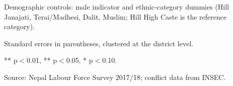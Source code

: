 \begin{table}[!h]
\begin{threeparttable}
\begin{tablenotes}
\item Demographic controls: male indicator and ethnic-category dummies (Hill Janajati, Terai/Madhesi, Dalit, Muslim; Hill High Caste is the reference category).
\item Standard errors in parentheses, clustered at the district level.
\item *** p$<$0.01, ** p$<$0.05, * p$<$0.10.
\item Source: Nepal Labour Force Survey 2017/18; conflict data from INSEC.
\end{tablenotes}
\end{threeparttable}
\end{table}
